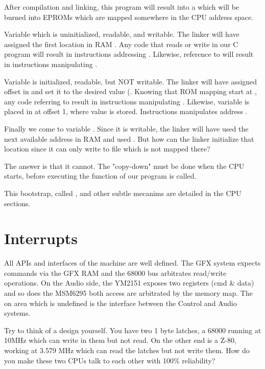 After compilation and linking, this program will result into a  which will be burned into EPROMs which are mapped somewhere in the CPU address space.


Variable  which is uninitialized, readable, and writable. The linker will have assigned the first location in RAM . Any code that reads or write  in our C program will result in instructions addressing . Likewise, reference to  will result in instructions manipulating .

Variable   is initialized, readable, but NOT writable. The linker will have assigned offset  in  and set it to the desired value (. Knowing that ROM mapping start at , any code referring to  result in instructions manipulating . Likewise, variable  is placed in  at offset 1, where value  is stored. Instructions manipulates address .

Finally we come to variable . Since it is writable, the linker will have used the next available address in RAM and used . But how can the linker initialize that location since it can only write to file  which is not mapped there? 

The answer is that it cannot. The "copy-down" must be done when the CPU starts, before executing the  function of our program is called. 

This bootstrap, called , and other subtle mecanims are detailed in the CPU sections.


\section{Interrupts}

All APIs and interfaces of the machine are well defined. The GFX system expects commands via the GFX RAM and the 68000 bus arbitrates read/write operations. On the Audio side, the YM2151 exposes two registers (cmd \& data) and so does the MSM6295 both access are arbitrated by the memory map. The on area which is undefined is the interface between the Control and Audio systems.

Try to think of a design yourself. You have two 1 byte latches, a 68000 running at 10MHz which can write in them but not read. On the other end is a Z-80, working at 3.579 MHz which can read the latches but not write them. How do you make these two CPUs talk to each other with 100\% reliability?

